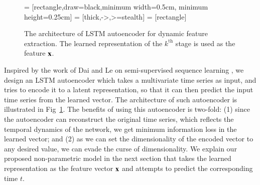 \begin{figure}
	\centering
	\footnotesize
	 = [rectangle,draw=black,minimum width=0.5cm, minimum height=0.25cm]
	 = [thick,->,>=stealth]
	 = [rectangle]
	\caption{The architecture of LSTM autoencoder for dynamic feature extraction. The learned representation of the $k^{\text{th}}$ stage is used as the feature $\mathbf{x}$.}
	\label{fig:autoencoder}
\end{figure}

Inspired by the work of Dai and Le on semi-supervised sequence learning \cite{dai2015semi}, we design an LSTM autoencoder which takes a multivariate time series as input, and tries to encode it to a latent representation, so that it can then predict the input time series from the learned vector. The architecture of such autoencoder is illustrated in Fig~\ref{fig:autoencoder}. The benefits of using this autoencoder is two-fold: (1) since the autoencoder can reconstruct the original time series, which reflects the temporal dynamics of the network, we get minimum information loss in the learned vector; and (2) as we can set the dimensionality of the encoded vector to any desired value, we can evade the curse of dimensionality. We explain our proposed non-parametric model in the next section that takes the learned representation as the feature vector $\mathbf{x}$ and attempts to predict the corresponding time $t$. 


